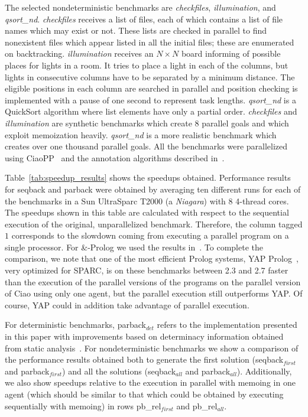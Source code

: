 \documentclass{tlp}
\newcounter{mnotei} \setcounter{mnotei}{0}
\newcommand{\mnote}[1]{{\scriptsize\textsf{\textcolor{blue}{$^{[\themnotei]}$}}}\marginpar{\scriptsize\textsf{\textcolor{red}{n.\themnotei: #1}}}\stepcounter{mnotei} }
\renewcommand{\mnote}[1]{}
\begin{document}
The selected nondeterministic benchmarks are \emph{checkfiles},
\emph{illumination}, and \emph{qsort\_nd}. \emph{checkfiles} receives a
list of files, each of which contains a list of file names which may
exist or not.
These lists are checked in parallel to find nonexistent files which
appear listed in all the initial files; these are enumerated on
backtracking.
\emph{illumination} receives an $N \times N$ board informing of
possible places for lights in a room.  It tries to place a light in
each of the columns, but lights in consecutive columns have to be
separated by a minimum distance.  The eligible positions in each
column are searched in parallel and position checking is implemented
with a pause of one second to represent task lengths.
\emph{qsort\_nd} is a QuickSort algorithm where list elements have
only a partial order.  \emph{checkfiles} and \emph{illumination} are
synthetic benchmarks which create 8 parallel goals and which exploit
memoization heavily.
\emph{qsort\_nd} is a more realistic benchmark which creates over one
thousand parallel goals.  All the benchmarks were parallelized using CiaoPP~\cite{ciaopp-sas03-journal-scp} and the
annotation algorithms described
in~\cite{annotators-jlp,daniel-phd,uudg-annotators-lopstr2007}.

Table~\ref{tab:speedup_results} shows the speedups obtained.
Performance results for \textsf{seqback} and \textsf{parback} were
obtained by averaging ten different runs for each of the benchmarks in
a Sun UltraSparc T2000 (a \emph{Niagara}) with 8 4-thread cores.  The
speedups shown in this table are calculated with respect to the
sequential execution of the original, unparallelized benchmark.
Therefore, the column tagged $1$ corresponds to the slowdown coming
from executing a parallel program on a single processor.  For
\textsf{\&-Prolog} we used the results in~\cite{ngc-and-prolog}. 
To complete the comparison, we note that one of the most efficient
Prolog systems, YAP Prolog~\cite{costa:yap-design-tplp}, 
very optimized for SPARC, is on these
benchmarks between 2.3 and 2.7 faster
than the execution of the
parallel versions of the programs on the parallel version of Ciao
using only one agent, but the parallel execution still outperforms
YAP.  Of course, YAP could in addition take advantage of parallel
execution.

For deterministic benchmarks, \textsf{parback$_{det}$} refers to the
implementation presented in this paper with improvements based on
determinacy information obtained from static
analysis~\cite{determ-lopstr04}.  For nondeterministic benchmarks we
show a comparison\mnote{Pablo, Amadeo: we do not actually say what we
  are comparing with.} of the performance results obtained both to generate
the first solution (\textsf{seqback$_{first}$} and
\textsf{parback$_{first}$}) and all the solutions
(\textsf{seqback$_{all}$} and \textsf{parback$_{all}$}).
Additionally, we also show speedups relative to the execution in
parallel with memoing in one agent (which should be similar to that
which could be obtained by executing sequentially with memoing) in
rows \textsf{pb\_rel$_{first}$} and \textsf{pb\_rel$_{all}$}.
\end{document}
